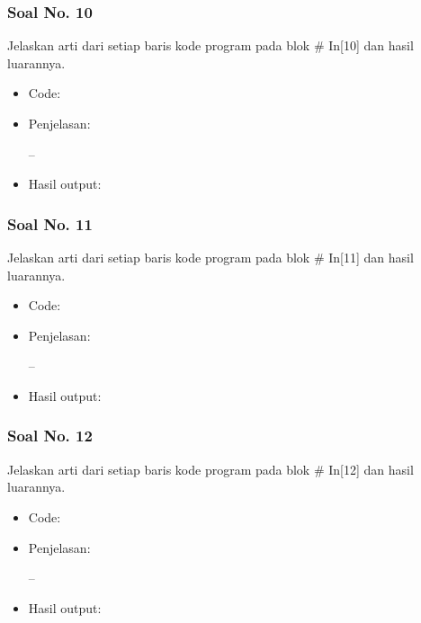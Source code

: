 \subsubsection{Soal No. 10}
Jelaskan arti dari setiap baris kode program pada blok \# In[10] dan hasil luarannya.

\begin{itemize}
\item Code:


\item Penjelasan:

--

\item Hasil output:

\end{itemize}

\subsubsection{Soal No. 11}
Jelaskan arti dari setiap baris kode program pada blok \# In[11] dan hasil luarannya.

\begin{itemize}
\item Code:


\item Penjelasan:

--

\item Hasil output:

\end{itemize}

\subsubsection{Soal No. 12}
Jelaskan arti dari setiap baris kode program pada blok \# In[12] dan hasil luarannya.

\begin{itemize}
\item Code:


\item Penjelasan:

--

\item Hasil output:

\end{itemize}

